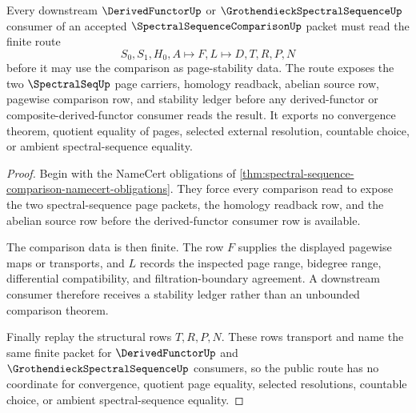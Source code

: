 \begin{theorem}
\label{thm:spectral-sequence-comparison-page-stability}
Every downstream $\DerivedFunctorUp$ or $\GrothendieckSpectralSequenceUp$ consumer of an accepted $\SpectralSequenceComparisonUp$ packet must read the finite route
$$
S_0,S_1,H_0,A \longmapsto F,L \longmapsto D,T,R,P,N
$$
before it may use the comparison as page-stability data. The route exposes the two $\SpectralSeqUp$ page carriers, homology readback, abelian source row, pagewise comparison row, and stability ledger before any derived-functor or composite-derived-functor consumer reads the result. It exports no convergence theorem, quotient equality of pages, selected external resolution, countable choice, or ambient spectral-sequence equality.
\end{theorem}
\begin{proof}
Begin with the NameCert obligations of \autoref{thm:spectral-sequence-comparison-namecert-obligations}. They force every comparison read to expose the two spectral-sequence page packets, the homology readback row, and the abelian source row before the derived-functor consumer row is available.

The comparison data is then finite. The row $F$ supplies the displayed pagewise maps or transports, and $L$ records the inspected page range, bidegree range, differential compatibility, and filtration-boundary agreement. A downstream consumer therefore receives a stability ledger rather than an unbounded comparison theorem.

Finally replay the structural rows $T,R,P,N$. These rows transport and name the same finite packet for $\DerivedFunctorUp$ and $\GrothendieckSpectralSequenceUp$ consumers, so the public route has no coordinate for convergence, quotient page equality, selected resolutions, countable choice, or ambient spectral-sequence equality.
\end{proof}




